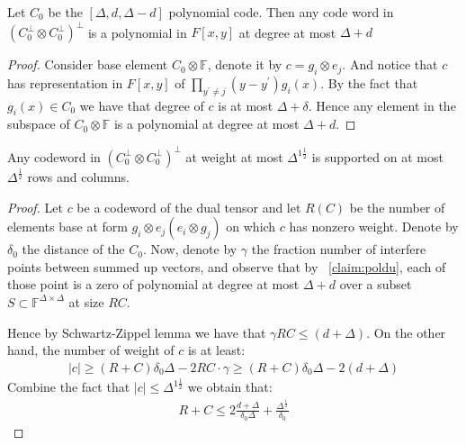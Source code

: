 \begin{claim}
  \label{claim:poldu}
  Let $C_{0}$ be the $[\Delta,d, \Delta-d]$ polynomial code. Then any code word in $\left( C_{0}^{\perp} \otimes C_{0}^{\perp} \right)^{\perp}$ is a polynomial in $F[x,y]$ at degree at most $\Delta + d$
\end{claim}
\begin{proof}
Consider base element $ C_{0} \otimes \mathbb{F} $, denote it by $c = g_{i} \otimes e_{j}$. And notice that $c$ has representation in $F[x,y]$ of $\prod_{y^{\prime} \neq j}{\left( y - y^{\prime} \right) }g_{i}\left( x \right)$. By the fact that $g_{i}\left( x \right) \in C_{0} $ we have that degree of $c$ is at most $\Delta + \delta$. Hence any element in the subspace of $C_{0} \otimes \mathbb{F}$ is a polynomial at degree at most $\Delta + d$.   
\end{proof}
\begin{claim}
  \label{claim:lim}
  Any codeword in $\left( C_{0}^{\perp} \otimes C_{0}^{\perp} \right)^{\perp}$ at weight at most $\Delta^{1 \frac{1}{2}}$ is supported on at most $\Delta^{\frac{1}{2}} $ rows and columns.
\end{claim}
\begin{proof}
  Let $c$ be a codeword of the dual tensor and let $R (C)$ be the number of elements base at form $g_{i}\otimes e_{j} (e_{i} \otimes g_{j})$ on which $c$ has nonzero weight. Denote by $\delta_{0}$ the distance of the $C_{0}$. Now, denote by $\gamma$ the fraction number of interfere points between summed up vectors, and observe that by ~\cref{claim:poldu}, each of those point is a zero of polynomial at degree at most $\Delta + d$ over a subset $S \subset \mathbb{F}^{\Delta\times \Delta} $ at size $RC$.     

  Hence by Schwartz-Zippel lemma \cite{Schwartz} we have that $\gamma RC \le \left( d + \Delta \right)$. On the other hand, the number of weight of $c$ is at least: 
\begin{equation*}
    \begin{split}
      |c| \ge \left( R + C  \right) \delta_{0}\Delta - 2RC \cdot \gamma  \ge \left( R + C \right)\delta_{0}\Delta -2 \left( d + \Delta  \right)
    \end{split}
  \end{equation*}
  Combine the fact that $|c| \le \Delta^{1 \frac{1}{2}}$ we obtain that: 
  \begin{equation*}
    \begin{split}
      R + C \le 2\frac{d + \Delta}{\delta_{0} \Delta} + \frac{\Delta^{\frac{1}{2}}}{\delta_{0}}
    \end{split}
  \end{equation*}
\end{proof}
  
